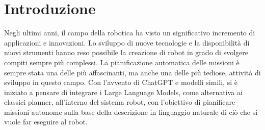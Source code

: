 \chapter*{Introduzione}

Negli ultimi anni, il campo della robotica ha visto un significativo incremento di applicazioni e innovazioni. Lo sviluppo di nuove tecnologie e la disponibilità di nuovi strumenti hanno reso possibile la creazione di robot in grado di svolgere compiti sempre più complessi. La pianificazione automatica delle missioni è sempre stata una delle più affascinanti, ma anche una delle più tediose, attività di sviluppo in questo campo. Con l'avvento di ChatGPT e modelli simili, si è iniziato a pensare di integrare i Large Language Models, come alternativa ai classici planner, all'interno del sistema robot, con l'obiettivo di pianificare missioni autonome sulla base della descrizione in linguaggio naturale di ciò che si vuole far eseguire al robot.
